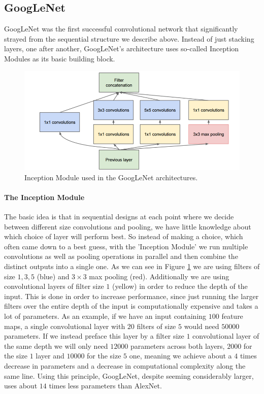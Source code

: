 \documentclass[preprint,12pt,3p]{elsarticle}
\begin{document}
\subsection{GoogLeNet}
GoogLeNet \cite{szegedy2014going} was the first successful convolutional network that significantly strayed from the sequential structure we describe above. Instead of just stacking layers, one after another, GoogLeNet's architecture uses so-called Inception Modules as its basic building block.

\begin{figure}
    \centering
    \includegraphics[scale=0.6]{figures/GoogLeNet3.png}
    \caption{Inception Module used in the GoogLeNet architectures.}
    \label{fig:inception}
\end{figure}


\paragraph{The Inception Module} The basic idea is that in sequential designs at each point where we decide between different size convolutions and pooling, we have little knowledge about which choice of layer will perform best. So instead of making a choice, which often came down to a best guess, with the 'Inception Module' we run multiple convolutions as well as pooling operations in parallel and then combine the distinct outputs into a single one. As we can see in Figure \ref{fig:inception} we are using filters of size $1,3,5$ (blue) and $3\times3$ max pooling (red). Additionally we are using convolutional layers of filter size $1$ (yellow) in order to reduce the depth of the input. This is done in order to increase performance, since just running the larger filters over the entire depth of the input is computationally expensive and takes a lot of parameters. As an example, if we have an input containing $100$ feature maps, a single convolutional layer with $20$ filters of size $5$ would need $50000$ parameters. If we instead preface this layer by a filter size $1$ convolutional layer of the same depth we will only need $12000$ parameters across both layers, $2000$ for the size $1$ layer and $10000$ for the size $5$ one, meaning we achieve about a $4$ times decrease in parameters and a decrease in computational complexity along the same line. Using this principle, GoogLeNet, despite seeming considerably larger, uses about $14$ times less parameters than AlexNet.
\end{document}
